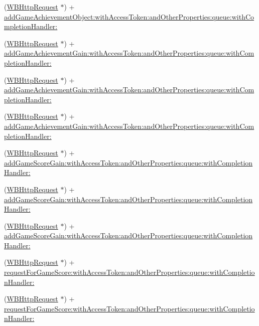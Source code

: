 \begin{DoxyCompactItemize}
\item 
(\mbox{\hyperlink{interface_w_b_http_request}{W\+B\+Http\+Request}} $\ast$) + \mbox{\hyperlink{interface_w_b_http_request_a3e9ccee69346b4924f899ce4127e6c24}{add\+Game\+Achievement\+Object\+:with\+Access\+Token\+:and\+Other\+Properties\+:queue\+:with\+Completion\+Handler\+:}}
\item 
(\mbox{\hyperlink{interface_w_b_http_request}{W\+B\+Http\+Request}} $\ast$) + \mbox{\hyperlink{interface_w_b_http_request_a49f7163ca8362f339d37df2b93e36d06}{add\+Game\+Achievement\+Gain\+:with\+Access\+Token\+:and\+Other\+Properties\+:queue\+:with\+Completion\+Handler\+:}}
\item 
(\mbox{\hyperlink{interface_w_b_http_request}{W\+B\+Http\+Request}} $\ast$) + \mbox{\hyperlink{interface_w_b_http_request_a49f7163ca8362f339d37df2b93e36d06}{add\+Game\+Achievement\+Gain\+:with\+Access\+Token\+:and\+Other\+Properties\+:queue\+:with\+Completion\+Handler\+:}}
\item 
(\mbox{\hyperlink{interface_w_b_http_request}{W\+B\+Http\+Request}} $\ast$) + \mbox{\hyperlink{interface_w_b_http_request_a49f7163ca8362f339d37df2b93e36d06}{add\+Game\+Achievement\+Gain\+:with\+Access\+Token\+:and\+Other\+Properties\+:queue\+:with\+Completion\+Handler\+:}}
\item 
(\mbox{\hyperlink{interface_w_b_http_request}{W\+B\+Http\+Request}} $\ast$) + \mbox{\hyperlink{interface_w_b_http_request_a267d11cd3679a39fa49e42efaa9bf301}{add\+Game\+Score\+Gain\+:with\+Access\+Token\+:and\+Other\+Properties\+:queue\+:with\+Completion\+Handler\+:}}
\item 
(\mbox{\hyperlink{interface_w_b_http_request}{W\+B\+Http\+Request}} $\ast$) + \mbox{\hyperlink{interface_w_b_http_request_a267d11cd3679a39fa49e42efaa9bf301}{add\+Game\+Score\+Gain\+:with\+Access\+Token\+:and\+Other\+Properties\+:queue\+:with\+Completion\+Handler\+:}}
\item 
(\mbox{\hyperlink{interface_w_b_http_request}{W\+B\+Http\+Request}} $\ast$) + \mbox{\hyperlink{interface_w_b_http_request_a267d11cd3679a39fa49e42efaa9bf301}{add\+Game\+Score\+Gain\+:with\+Access\+Token\+:and\+Other\+Properties\+:queue\+:with\+Completion\+Handler\+:}}
\item 
(\mbox{\hyperlink{interface_w_b_http_request}{W\+B\+Http\+Request}} $\ast$) + \mbox{\hyperlink{interface_w_b_http_request_aebf781874099f199819a90a1f83f06d5}{request\+For\+Game\+Score\+:with\+Access\+Token\+:and\+Other\+Properties\+:queue\+:with\+Completion\+Handler\+:}}
\item 
(\mbox{\hyperlink{interface_w_b_http_request}{W\+B\+Http\+Request}} $\ast$) + \mbox{\hyperlink{interface_w_b_http_request_aebf781874099f199819a90a1f83f06d5}{request\+For\+Game\+Score\+:with\+Access\+Token\+:and\+Other\+Properties\+:queue\+:with\+Completion\+Handler\+:}}

\end{DoxyCompactItemize}
